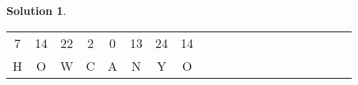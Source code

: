 \documentclass[11pt]{article}
\theoremstyle{definition}\newtheorem{definition}{Definition}
\theoremstyle{definition}\newtheorem{question}{Question}
\theoremstyle{definition}\newtheorem*{solution}{Solution}
\begin{document}
\begin{solution}
\begin{center}
\begin{tabular}{|cccccccccccccccccccc|}
                7     & 14    & 22    & 2                          & \multicolumn{1}{c|}{0}     & 13    & 24    & \multicolumn{1}{c|}{14}    &       &                            &       &                            &       &       &                            &                            &       &       &       &       \\ \cline{1-8}
                H     & O     & W     & C                          & \multicolumn{1}{c|}{A}     & N     & Y     & \multicolumn{1}{c|}{O}     &       &                            &       &                            &       &       &                            &                            &       &       &       &       \\ \hline
                \end{tabular}
            \end{center}


\end{solution}
\end{document}
